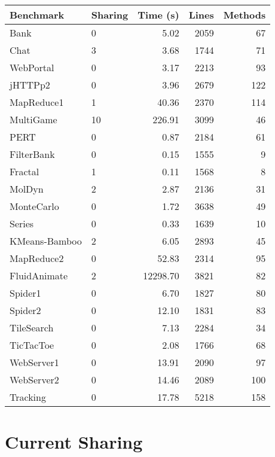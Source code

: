 \documentclass{amsart}[9pt]
\begin{document}
\begin{tabular}{|l|l|r|r|r|}
\hline
Benchmark & Sharing & Time (s) & Lines & Methods \\
\hline
Bank          & 0  & 5.02     & 2059 & 67 \\
Chat          & 3  & 3.68     & 1744 & 71 \\
WebPortal     & 0  & 3.17     & 2213 & 93 \\
jHTTPp2       & 0  & 3.96     & 2679 & 122 \\
MapReduce1    & 1  & 40.36    & 2370 & 114 \\
MultiGame     & 10 & 226.91   & 3099 & 46 \\
PERT          & 0  & 0.87     & 2184 & 61 \\
FilterBank    & 0  & 0.15     & 1555 & 9 \\
Fractal       & 1  & 0.11     & 1568 & 8 \\
MolDyn        & 2  & 2.87     & 2136 & 31 \\
MonteCarlo    & 0  & 1.72     & 3638 & 49 \\
Series        & 0  & 0.33     & 1639 & 10 \\
KMeans-Bamboo & 2  & 6.05     & 2893 & 45 \\
MapReduce2    & 0  & 52.83    & 2314 & 95 \\
FluidAnimate  & 2  & 12298.70 & 3821 & 82 \\
Spider1       & 0  & 6.70     & 1827 & 80 \\
Spider2       & 0  & 12.10    & 1831 & 83 \\
TileSearch    & 0  & 7.13     & 2284 & 34 \\
TicTacToe     & 0  & 2.08     & 1766 & 68 \\
WebServer1    & 0  & 13.91    & 2090 & 97 \\
WebServer2    & 0  & 14.46    & 2089 & 100 \\
Tracking      & 0  & 17.78    & 5218 & 158 \\
\hline
\end{tabular}








\section{Current Sharing}


\end{document}
